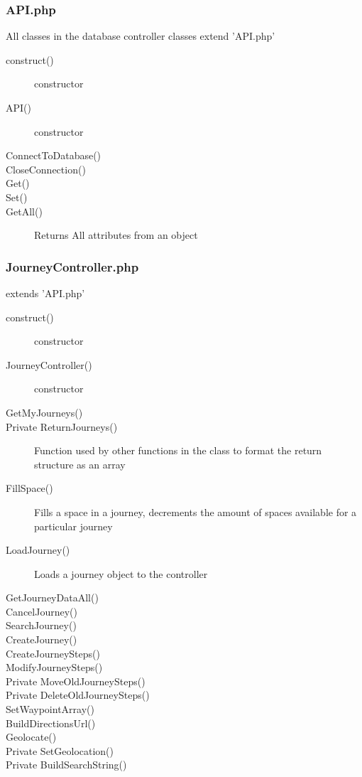 \documentclass[11pt]{article}
\begin{document}
\subsubsection{API.php}

All classes in the database controller classes extend 'API.php'

\begin{description}
\item[\textunderscore \textunderscore construct()] constructor
\item[API()] constructor
\item[ConnectToDatabase()]
\item[CloseConnection()]
\item[Get()]
\item[Set()]
\item[GetAll()] Returns All attributes from an object
\end{description}

\subsubsection{Journey\textunderscore Controller.php} 
extends 'API.php'
\begin{description}
\item[\textunderscore \textunderscore construct()] constructor
\item[Journey\textunderscore Controller()] constructor
\item[GetMyJourneys()] 
\item[Private ReturnJourneys()] Function used by other functions in the class to format the return structure as an array
\item[FillSpace()] Fills a space in a journey, decrements the amount of spaces available for a particular journey
\item[LoadJourney()] Loads a journey object to the controller
\item[GetJourneyDataAll()]
\item[CancelJourney()]
\item[SearchJourney()]
\item[CreateJourney()]
\item[CreateJourneySteps()]
\item[ModifyJourneySteps()]
\item[Private MoveOldJourneySteps()]
\item[Private DeleteOldJourneySteps()]
\item[SetWaypointArray()]
\item[BuildDirectionsUrl()]
\item[Geolocate()]
\item[Private SetGeolocation()]
\item[Private BuildSearchString()]
\end{description}
\end{document}
